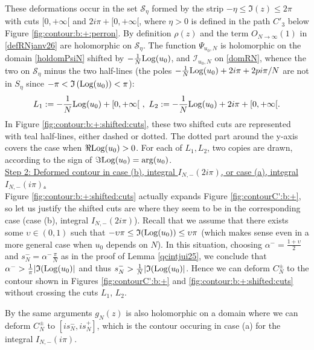 \documentclass[11pt]{amsart}
\newcommand{\Log}{{\rm Log}}
\newcommand{\ra}{\rightarrow}
\begin{document}
{These deformations occur in the set $\mathcal{S}_\eta$ formed by the strip $-\eta \leq \mathfrak{I}(z)\leq 2\pi$ with cuts $[0,+\infty[$ and $2i\pi + [0,+\infty[$, where $\eta>0$ is defined in the path $C'_3$ below Figure \ref{fig:contour:b:+:perron}. By definition  $\rho(z)$ and the term $\textstyle O_{N\ra \infty}(1)$ in \eqref{defRNjanv26} are holomorphic on $\mathcal{S}_\eta$. The function $\Psi_{u_0,N}$ is holomorphic on the domain \eqref{holdomPsiN} shifted by $\textstyle -\frac{1}{N}\Log(u_{0})$, and $\mathcal{I}_{u_0,N}$ on \eqref{domRN}, whence the two on $\mathcal{S}_\eta$ minus the two half-lines (the poles $\textstyle -\frac{1}{N}\Log(u_{0})+ 2i\pi+2pi\pi/N$ are not in $S_\eta$ since $-\pi < \mathfrak{I}\left(\Log(u_{0})\right)<  \pi$):
$$ L_1:=  -\frac{1}{N}\Log(u_{0})+[0,+\infty[ \ ,\  L_2:= -\frac{1}{N}\Log(u_{0})+2i\pi + [0,+\infty[.$$
In Figure \ref{fig:contour:b:+:shifted:cuts}, these two shifted cuts are represented with teal half-lines, either dashed or dotted. The dotted part around the y-axis covers the case when $\Re\Log(u_0)>0$. For each of $L_1, L_2$, two copies are drawn, according to the sign of $\Im\Log(u_0)=\arg(u_0)$.\\

\underline{Step 2: Deformed contour in case (b), integral $I_{N,-}(2i\pi)$, or case (a), integral $I_{N,-}(i\pi)$.}\\
Figure \ref{fig:contour:b:+:shifted:cuts} actually expands Figure \ref{fig:contourC':b:+}, so let us justify the shifted cuts are where they seem to be in the corresponding case (case (b), integral $I_{N,-}(2i\pi)$). Recall that we assume that there exists some $\upsilon \in (0,1)$ such that 
$-\upsilon \pi\leq \mathfrak{I}(\Log(u_{0}))\leq \upsilon \pi$
(which makes sense even in a more general case when $u_0$ depends on $N$). In this situation, choosing $\textstyle \alpha^-=\frac{1+\upsilon}{2}$ and  $\textstyle s_N^-=\alpha^-\frac{\pi}{N}$ as in the proof of Lemma \ref{qcintjui25}, we conclude that  $\textstyle \alpha^-> \frac{1}{\pi}\vert \mathfrak{I}(\Log(u_{0})\vert$ and thus $\textstyle s_N^-> \frac{1}{N}\vert \mathfrak{I}(\Log(u_{0})\vert$. 
Hence we can deform $C_N^\pm$ to the contour shown in Figures \ref{fig:contourC':b:+} and \ref{fig:contour:b:+:shifted:cuts} without crossing the cuts $L_1$, $L_2$.

By the same arguments $g_N(z)$ is also holomorphic on a domain where we can deform $C_N^\pm$ to $[is_N^-,is_N^+]$, which is the contour occuring in case (a) for the integral $I_{N,-}(i\pi)$.

}
\end{document}
